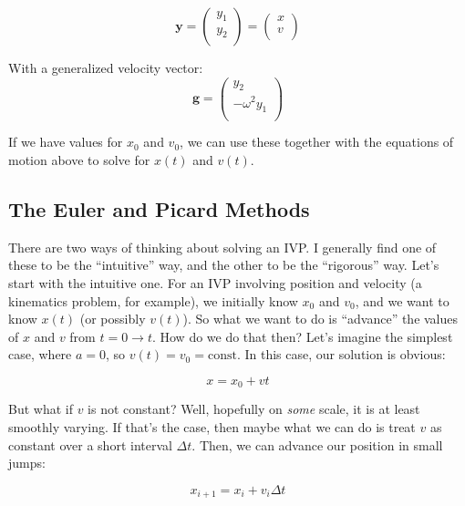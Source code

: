 \documentclass{article}
\theoremstyle{demo}
\begin{document}
\begin{equation}
    \mathbf{y} = 
    \begin{pmatrix}
        y_1 \\
        y_2 \\
    \end{pmatrix}
    =
    \begin{pmatrix}
        x \\
        v \\
    \end{pmatrix}
\end{equation}

With a generalized velocity vector:
\begin{equation}
    \mathbf{g} = 
    \begin{pmatrix}
        y_2 \\
        -\omega^2 y_1 \\
    \end{pmatrix}
\end{equation}

If we have values for $x_0$ and $v_0$, we can use these together with the
equations of motion above to solve for $x(t)$ and $v(t)$.

\subsection{The Euler and Picard Methods}
There are two ways of thinking about solving an IVP.  I generally find one of
these to be the ``intuitive'' way, and the other to be the ``rigorous'' way.
Let's start with the intuitive one.  For an IVP involving position and velocity
(a kinematics problem, for example), we initially know $x_0$ and $v_0$, and we
want to know $x(t)$ (or possibly $v(t)$).  So what we want to do is ``advance''
the values of $x$ and $v$ from $t=0\rightarrow t$.  How do we do that then?
Let's imagine the simplest case, where $a=0$, so $v(t)=v_0=\mathrm{const}$.  In
this case, our solution is obvious:

\begin{equation}
    x = x_0 + vt
\end{equation}

But what if $v$ is not constant?  Well, hopefully on \textit{some} scale, it is
at least smoothly varying.  If that's the case, then maybe what we can do is
treat $v$ as constant over a short interval $\Delta t$.  Then, we can advance
our position in small jumps:

\begin{equation}
    x_{i+1} = x_i + v_i \Delta t
\end{equation}
\end{document}

